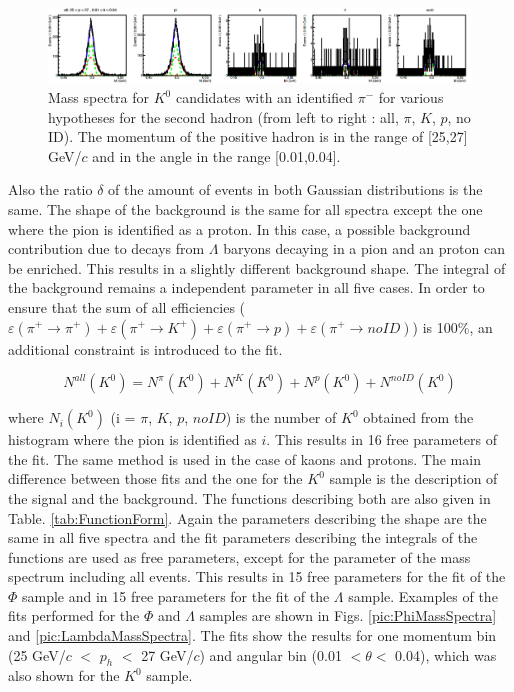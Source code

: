 \begin{figure}[!h]
  \centering
	\includegraphics[scale=0.3]{./gfx/K0MassSpectra.png}
	\caption{Mass spectra for $K^0$ candidates with an identified $\pi^-$ for various hypotheses for the second hadron (from left to right : all, $\pi$, $K$, $p$, no ID). The momentum of the positive hadron is in the range of [25,27] GeV/$c$ and in the angle in the range [0.01,0.04].}
	\label{pic:K0MassSpectra}
\end{figure}

Also the ratio $\delta$ of the amount of events in both Gaussian distributions is the same. The shape of the background is the same for all spectra except the one where the pion is identified as a proton. In this case, a possible background contribution due to decays from $\Lambda$ baryons decaying in a pion and an proton can be enriched. This results in  a slightly different background shape. The integral of the background remains a independent parameter in all five cases. In order to ensure that the sum of all efficiencies  ($\varepsilon(\pi^+ \rightarrow \pi^+)  + \varepsilon(\pi^+ \rightarrow K^+ ) + \varepsilon(\pi^+ \rightarrow p ) + \varepsilon(\pi^+ \rightarrow noID)$) is 100\%, an additional constraint is introduced to the fit.

\begin{equation}
  N^{all}(K^0) = N^{\pi}(K^0) + N^{K}(K^0) + N^{p}(K^0) + N^{noID}(K^0)
\end{equation}

where $N_i(K^0)$ (i = $\pi$, $K$, $p$, $noID$) is the number of $K^0$ obtained from the histogram where the pion is identified as $i$. This results in 16 free parameters of the fit. The same method is used in the case of kaons and protons. The main difference between those fits and the one for the $K^0$ sample is the description of the signal and the background. The functions describing both are also given in Table. \ref{tab:FunctionForm}. Again the parameters describing the shape are the same in all five spectra and the fit parameters  describing the integrals of the functions are used as free parameters, except for the parameter of the mass spectrum including all events. This results in 15 free parameters for the fit of the $\Phi$ sample and in 15 free parameters for the fit of the $\Lambda$ sample. Examples of the fits performed for the $\Phi$ and $\Lambda$ samples are shown in Figs. \ref{pic:PhiMassSpectra} and \ref{pic:LambdaMassSpectra}. The fits show the results for one momentum bin (25 GeV/$c$ $<$ $p_h$ $<$ 27 GeV/$c$) and angular bin (0.01 $< \theta <$ 0.04), which was also shown for the $K^0$ sample.

